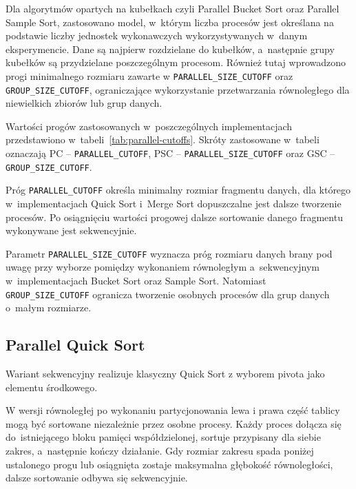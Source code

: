 Dla algorytmów opartych na kubełkach czyli Parallel Bucket Sort oraz Parallel Sample Sort, zastosowano model, 
w~którym liczba procesów jest określana na podstawie liczby jednostek wykonawczych wykorzystywanych w~danym eksperymencie. 
Dane są najpierw rozdzielane do kubełków, a~następnie grupy kubełków są przydzielane poszczególnym procesom. 
Również tutaj wprowadzono progi minimalnego rozmiaru zawarte w \texttt{PARALLEL\_SIZE\_CUTOFF} 
oraz \texttt{GROUP\_SIZE\_CUTOFF}, ograniczające wykorzystanie przetwarzania równoległego dla niewielkich zbiorów lub grup danych.

Wartości progów zastosowanych w~poszczególnych implementacjach przedstawiono w~tabeli~\ref{tab:parallel-cutoffs}.
Skróty zastosowane w~tabeli oznaczają PC -- \texttt{PARALLEL\allowbreak\_CUTOFF},
PSC -- \texttt{PARALLEL\allowbreak\_SIZE\allowbreak\_CUTOFF} oraz GSC -- \texttt{GROUP\allowbreak\_SIZE\allowbreak\_CUTOFF}.



Próg \texttt{PARALLEL\_CUTOFF} określa minimalny rozmiar fragmentu danych,
dla którego w~implementacjach Quick Sort i~Merge Sort dopuszczalne jest dalsze tworzenie procesów.
Po osiągnięciu wartości progowej dalsze sortowanie danego fragmentu wykonywane jest sekwencyjnie.

Parametr \texttt{PARALLEL\_SIZE\_CUTOFF} wyznacza próg rozmiaru danych
brany pod uwagę przy wyborze pomiędzy wykonaniem równoległym a~sekwencyjnym w~implementacjach Bucket Sort oraz Sample Sort. 
Natomiast \texttt{GROUP\_SIZE\_CUTOFF} ogranicza tworzenie osobnych procesów dla grup danych o~małym rozmiarze. 

\subsection*{Parallel Quick Sort}

Wariant sekwencyjny realizuje klasyczny Quick Sort z wyborem pivota jako elementu środkowego.



W wersji równoległej po wykonaniu partycjonowania lewa i prawa część tablicy mogą być sortowane niezależnie przez osobne procesy. 
Każdy proces dołącza się do~istniejącego bloku pamięci współdzielonej, sortuje przypisany dla siebie zakres, a~następnie kończy działanie. 
Gdy rozmiar zakresu spada poniżej ustalonego progu lub osiągnięta zostaje maksymalna głębokość równoległości, 
dalsze sortowanie odbywa się sekwencyjnie.

